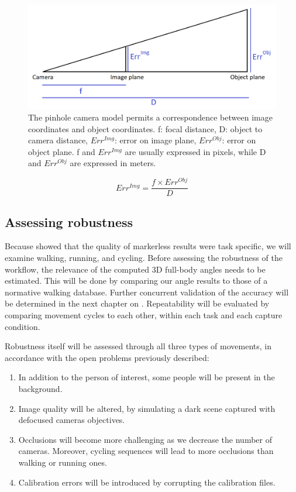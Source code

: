 \begin{figure}[!ht]
	\centering
	\def\svgwidth{1\columnwidth}
	\fontsize{10pt}{10pt}\selectfont
	\includegraphics[width=\linewidth]{"../Chap4/Figures/Fig_PixelMeterCorrespondance.png"}
	\caption{The pinhole camera model permits a correspondence between image coordinates and object coordinates. f: focal distance, D: object to camera distance, $Err^{Img}$: error on image plane, $Err^{Obj}$: error on object plane. f and $Err^{Img}$ are usually expressed in pixels, while D and $Err^{Obj}$ are expressed in meters.}
	\label{fig_pixmeterscorrespondance}
\end{figure}

\begin{equation}
      Err^{Img} = \frac{f \times Err^{Obj}}{D} 
      \label{eqn:errobjimg}
\end{equation}


\subsection{Assessing robustness}

Because \cite{Needham2021a} showed that the quality of markerless results were task specific, we will examine walking, running, and cycling. Before assessing the robustness of the workflow, the relevance of the computed 3D full-body angles needs to be estimated. This will be done by comparing our angle results to those of a normative walking database. Further concurrent validation of the accuracy will be determined in the next chapter on . Repeatability will be evaluated by comparing movement cycles to each other, within each task and each capture condition. 

Robustness itself will be assessed through all three types of movements, in accordance with the open problems previously described:
\begin{enumerate}[itemsep=0em, topsep=0em, leftmargin=*]
      \item In addition to the person of interest, some people will be present in the background. 
      \item Image quality will be altered, by simulating a dark scene captured with defocused cameras objectives.
      \item Occlusions will become more challenging as we decrease the number of cameras. Moreover, cycling sequences will lead to more occlusions than walking or running ones.
      \item Calibration errors will be introduced by corrupting the calibration files.
\end{enumerate}

